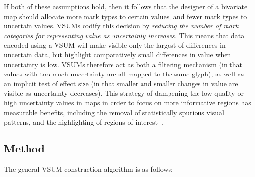 \documentclass{vgtc}                          %
\begin{document}
If both of these assumptions hold, then it follows that the designer of a bivariate map should allocate more mark types to certain values, and fewer mark types to uncertain values. VSUMs codify this decision by \emph{reducing the number of mark categories for representing value as uncertainty increases.} This means that data encoded using a VSUM will make visible only the largest of differences in uncertain data, but highlight comparatively small differences in value when uncertainty is low. VSUMs therefore act as both a filtering mechanism (in that values with too much uncertainty are all mapped to the same glyph), as well as an implicit test of effect size (in that smaller and smaller changes in value are visible as uncertainty decreases). This strategy of dampening the low quality or high uncertainty values in maps in order to focus on more informative regions has measurable benefits, including the removal of statistically spurious visual patterns, and the highlighting of regions of interest~\cite{correll2017surprise}.

\subsection{Method}

\flowFig

The general VSUM construction algorithm is as follows:
\end{document}
